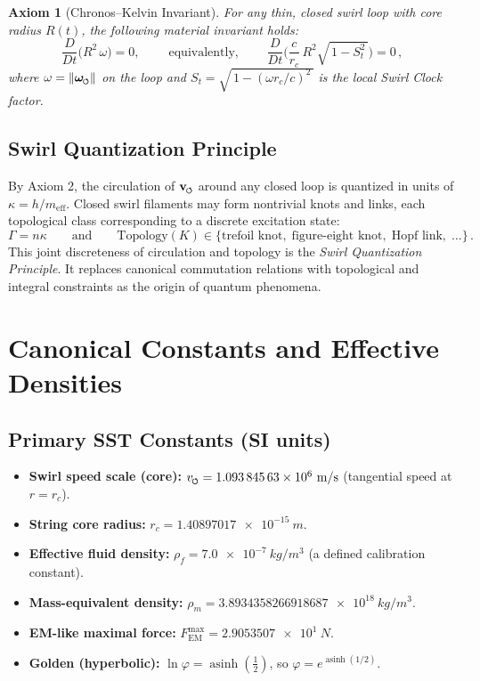 \documentclass[11pt]{article}
\newcommand{\swirlarrow}{%
    \mathchoice{\mkern-2mu\scriptstyle\boldsymbol{\circlearrowleft}}%
    {\mkern-2mu\scriptstyle\boldsymbol{\circlearrowleft}}%
    {\mkern-2mu\scriptscriptstyle\boldsymbol{\circlearrowleft}}%
    {\mkern-2mu\scriptscriptstyle\boldsymbol{\circlearrowleft}}%
}
\newcommand{\vswirl}{\mathbf{v}_{\swirlarrow}}
\newcommand{\omegas}{\boldsymbol{\omega}_{\swirlarrow}}  %
\newcommand{\vscore}{v_{\swirlarrow}}                    %
\newcommand{\rhof}{\rho_{\!f}}                           %
\newcommand{\rhom}{\rho_{\!m}}                           %
\newcommand{\rc}{r_c}                                    %
\newcommand{\FmaxEM}{F_{\mathrm{EM}}^{\max}}             %
\newtheorem{axiom}{Axiom}
\begin{document}
    \begin{axiom}[Chronos–Kelvin Invariant]
    \label{ax:chronos-kelvin}
    For any thin, closed swirl loop with core radius $R(t)$, the following material invariant holds:
    \begin{equation}
    \boxed{\;
    \frac{D}{Dt}\!\Big(R^2\,\omega\Big)=0,
        \;} \qquad \text{equivalently,} \qquad
    \boxed{\;
    \frac{D}{Dt}\!\Big(
    \frac{c}{r_c}\,R^2 \sqrt{\,1-S_t^2\,}
    \Big)=0\,,
        \;}
    \label{eq:CK}
    \end{equation}
    where $\omega=\|\omegas\|$ on the loop and $S_t=\sqrt{\,1-(\omega r_c/c)^2\,}$ is the local Swirl Clock factor.
    \end{axiom}

    \subsection{Swirl Quantization Principle}
        \label{sec:swirl_quantization}
        By Axiom 2, the circulation of $\vswirl$ around any closed loop is quantized in units of $\kappa=h/m_{\text{eff}}$. Closed swirl filaments may form nontrivial knots and links, each topological class corresponding to a discrete excitation state:
        \[
            \Gamma = n\kappa \qquad \text{and} \qquad \text{Topology}(K)\in \{\text{trefoil knot},\; \text{figure-eight knot},\; \text{Hopf link},\;\dots\}\,.
        \]
        This joint discreteness of circulation and topology is the \emph{Swirl Quantization Principle}. It replaces canonical commutation relations with topological and integral constraints as the origin of quantum phenomena.

\section{Canonical Constants and Effective Densities}
    \label{sec:canonical_constants}
    \subsection*{Primary SST Constants (SI units)}
        \begin{itemize}
        \item \textbf{Swirl speed scale (core):} $\vscore = \num{1.09384563e6}\ \si{m/s}$ (tangential speed at $r=\rc$).
        \item \textbf{String core radius:} $\rc = \num{1.40897017e-15}\ \si{m}$.
        \item \textbf{Effective fluid density:} $\rhof = \num{7.0e-7}\ \si{kg/m^3}$ (a defined calibration constant).
        \item \textbf{Mass-equivalent density:} $\rhom = \num{3.8934358266918687e18}\ \si{kg/m^3}$.
        \item \textbf{EM-like maximal force:} $\FmaxEM = \num{2.9053507e1}\ \si{N}$.
        \item \textbf{Golden (hyperbolic):} $\ln\varphi=\operatorname{asinh}\!\left(\tfrac12\right)$, so $\varphi=e^{\operatorname{asinh}(1/2)}$.
        \end{itemize}
\end{document}
